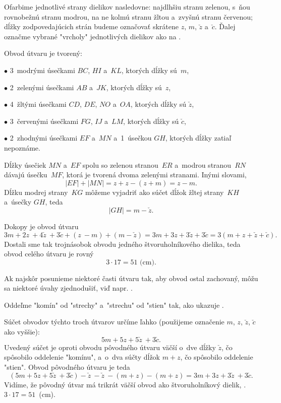 {%
Ofarbime jednotlivé strany dielikov nasledovne:
najdlhšiu stranu zelenou, s~ňou rovnobežnú stranu modrou, na ne kolmú stranu
žltou a~zvyšnú stranu červenou;
dĺžky zodpovedajúcich strán budeme označovať skrátene $z$, $m$, $\check z$
a~$\check c$.
Ďalej označme vybrané "vrcholy" jednotlivých dielikov ako na \obr{}.
%

\noindent
Obvod útvaru je tvorený:
\item{$\bullet$} 3~modrými úsečkami $BC$, $HI$ a~$KL$, ktorých dĺžky sú~$m$,
\item{$\bullet$} 2~zelenými úsečkami $AB$ a~$JK$,  ktorých dĺžky sú~$z$,
\item{$\bullet$} 4~žltými úsečkami $CD$, $DE$, $NO$ a~$OA$, ktorých dĺžky sú $\check z$,
\item{$\bullet$} 3~červenými úsečkami $FG$, $IJ$ a~$LM$, ktorých dĺžky sú $\check c$,
\item{$\bullet$} 2~zhodnými úsečkami $EF$ a~$MN$ a~1~úsečkou $GH$, ktorých dĺžky zatiaľ nepoznáme.

Dĺžky úsečiek $MN$ a~$EF$ spolu so zelenou stranou~$ER$ a~modrou stranou~$RN$
dávajú úsečku~$MF$, ktorá je tvorená dvoma zelenými stranami.
Inými slovami,
$$
|EF|+|MN| = z+z-(z+m) = z-m.
$$
Dĺžku modrej strany~$KG$ môžeme vyjadriť ako súčet dĺžok žltej strany~$KH$
a~úsečky $GH$, teda
$$
|GH|=m-\check z.
$$

Dokopy je obvod útvaru
$$
3 m + 2 z~+ 4\check z~+ 3 \check c + (z~- m) + ( m - \check z)
=3 m+ 3 z+ 3 \check z+ 3 \check c
= 3(m+ z+ \check z+ \check c).
$$
Dostali sme tak trojnásobok obvodu jedného štvoruholníkového dielika, teda obvod
celého útvaru je rovný
$$
3\cdot 17 = 51\text{ (cm)}.
$$

\poznamka
Ak najskôr posunieme niektoré časti útvaru tak, aby obvod ostal zachovaný, môžu sa
niektoré úvahy zjednodušiť, viď napr. \obr.
%

\ineriesenie
Oddeľme "komín" od "strechy" a~"strechu" od "stien" tak, ako ukazuje \obr{}.
%

Súčet obvodov týchto troch útvarov určíme ľahko (použijeme označenie $m$, $z$,
$\check z$, $\check c$ ako vyššie):
$$
5m + 5z + 5\check z~+ 3\check c.
$$
Uvedený súčet je oproti obvodu pôvodného útvaru väčší o~dve dĺžky $\check z$, čo
spôsobilo oddelenie "komínu", a~o~dva súčty dĺžok $m + z$, čo spôsobilo oddelenie "stien".
Obvod pôvodného útvaru je teda
$$ (5m + 5z + 5\check z~+ 3\check c) - \check z~- \check z~- (m + z) - (m + z)
= 3m + 3z + 3\check z~+ 3\check c.
$$
Vidíme, že pôvodný útvar má trikrát väčší obvod ako štvoruholníkový dielik, \tj.
$3\cdot 17 = 51$~(cm).}

